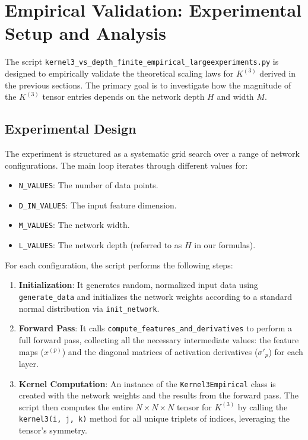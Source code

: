 \documentclass[11pt,a4paper]{article}
\begin{document}
\newpage

\section{Empirical Validation: Experimental Setup and Analysis}

The script \texttt{kernel3\_vs\_depth\_finite\_empirical\_largeexperiments.py} is designed to empirically validate the theoretical scaling laws for $K^{(3)}$ derived in the previous sections. The primary goal is to investigate how the magnitude of the $K^{(3)}$ tensor entries depends on the network depth $H$ and width $M$.

\subsection{Experimental Design}

The experiment is structured as a systematic grid search over a range of network configurations. The main loop iterates through different values for:
\begin{itemize}
    \item \texttt{N\_VALUES}: The number of data points.
    \item \texttt{D\_IN\_VALUES}: The input feature dimension.
    \item \texttt{M\_VALUES}: The network width.
    \item \texttt{L\_VALUES}: The network depth (referred to as $H$ in our formulas).
\end{itemize}

For each configuration, the script performs the following steps:
\begin{enumerate}
    \item \textbf{Initialization}: It generates random, normalized input data using \texttt{generate\_data} and initializes the network weights according to a standard normal distribution via \texttt{init\_network}.
    \item \textbf{Forward Pass}: It calls \texttt{compute\_features\_and\_derivatives} to perform a full forward pass, collecting all the necessary intermediate values: the feature maps ($x^{(p)}$) and the diagonal matrices of activation derivatives ($\sigma'_p$) for each layer.
    \item \textbf{Kernel Computation}: An instance of the \texttt{Kernel3Empirical} class is created with the network weights and the results from the forward pass. The script then computes the entire $N \times N \times N$ tensor for $K^{(3)}$ by calling the \texttt{kernel3(i, j, k)} method for all unique triplets of indices, leveraging the tensor's symmetry.
\end{enumerate}
\end{document}
